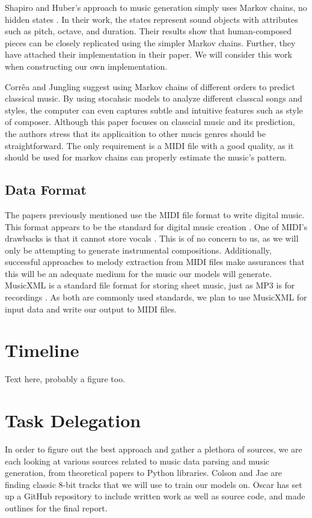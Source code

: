 \documentclass{article}
\begin{document}
Shapiro and Huber's approach to music generation simply uses Markov chains, no hidden states \cite{shapiro_huber_2021}. In their work, the states represent sound 
objects with attributes such as pitch, octave, and duration. Their results show that human-composed pieces can be closely replicated using the simpler Markov chains. 
Further, they have attached their implementation in their paper. We will consider this work when constructing our own implementation.

Corrêa and Jungling suggest using Markov chains of different orders to predict classical music. By using stocahsic models to analyze different classcal songs and styles,
the computer can even captures subtle and intuitive features such as style of composer. Although this paper focuses on classcial music and its prediction, the authors stress
that its applicaition to other mucis genres should be straightforward. The only requirement is a MIDI file with a good quality, as it should be used for markov chains can 
properly estimate the music's pattern.

\subsection{Data Format}
The papers previously mentioned use the MIDI file format to write digital music. This format appears to be the standard for digital music creation \cite{midi_format}. 
One of MIDI's drawbacks is that it cannot store vocals \cite{cataltepe_2007}. This is of no concern to us, as we will only be attempting to generate instrumental 
compositions. Additionally, successful approaches to melody extraction from MIDI files \cite{ozcan_2005} make assurances that this will be an adequate medium for the 
music our models will generate. MusicXML is a standard file format for storing sheet music, just as MP3 is for recordings \cite{musicxml_2022}. As both are commonly used 
standards, we plan to use MusicXML for input data and write our output to MIDI files.

\section{Timeline}
Text here, probably a figure too. 

\section{Task Delegation}
In order to figure out the best approach and gather a plethora of sources, we are each looking at various sources related to music data parsing and music generation, 
from theoretical papers to Python libraries. Colson and Jae are finding classic 8-bit tracks that we will use to train our models on. Oscar has set up a GitHub repository 
to include written work as well as source code, and made outlines for the final report. 
\end{document}
